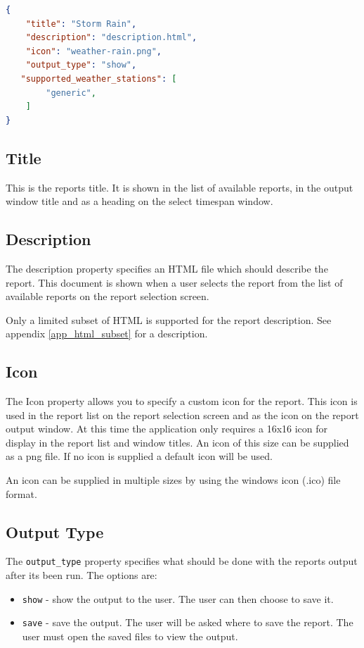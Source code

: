 \documentclass[a4paper,10pt]{book}
\begin{document}
\begin{lstlisting}[language=json]
{
    "title": "Storm Rain",
    "description": "description.html",
    "icon": "weather-rain.png",
    "output_type": "show",
   "supported_weather_stations": [
        "generic",
    ]
}
\end{lstlisting}

\subsection{Title}
This is the reports title. It is shown in the list of available reports, in the output window title and as a heading on the select timespan window.

\subsection{Description}
The description property specifies an HTML file which should describe the report. This document is shown when a user selects the report from the list of available reports on the report selection screen.

Only a limited subset of HTML is supported for the report description. See appendix \ref{app_html_subset} for a description.

\subsection{Icon}
The Icon property allows you to specify a custom icon for the report. This icon is used in the report list on the report selection screen and as the icon on the report output window. At this time the application only requires a 16x16 icon for display in the report list and window titles. An icon of this size can be supplied as a png file. If no icon is supplied a default icon will be used.

An icon can be supplied in multiple sizes by using the windows icon (.ico) file format.

\subsection{Output Type}
The \verb|output_type| property specifies what should be done with the reports output after its been run. The options are:
\begin{itemize}
\item \verb|show| - show the output to the user. The user can then choose to save it.
\item \verb|save| - save the output. The user will be asked where to save the report. The user must open the saved files to view the output.
\end{itemize}
\end{document}
